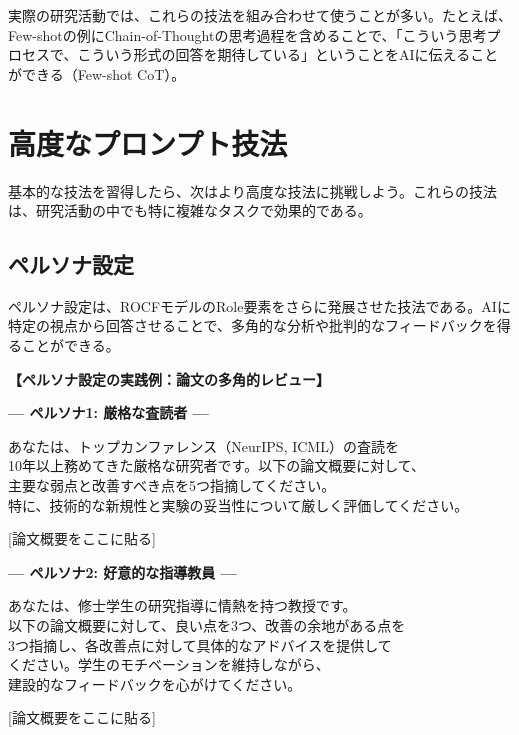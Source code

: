 実際の研究活動では、これらの技法を組み合わせて使うことが多い。たとえば、Few-shotの例にChain-of-Thoughtの思考過程を含めることで、「こういう思考プロセスで、こういう形式の回答を期待している」ということをAIに伝えることができる（Few-shot CoT）。

\section{高度なプロンプト技法}
\label{sec:2.4}

基本的な技法を習得したら、次はより高度な技法に挑戦しよう。これらの技法は、研究活動の中でも特に複雑なタスクで効果的である。

\subsection{ペルソナ設定}

ペルソナ設定は、ROCFモデルのRole要素をさらに発展させた技法である。AIに特定の視点から回答させることで、多角的な分析や批判的なフィードバックを得ることができる。

\begin{promptbox}
\textbf{【ペルソナ設定の実践例：論文の多角的レビュー】}

\textbf{--- ペルソナ1: 厳格な査読者 ---}

あなたは、トップカンファレンス（NeurIPS, ICML）の査読を\\
10年以上務めてきた厳格な研究者です。以下の論文概要に対して、\\
主要な弱点と改善すべき点を5つ指摘してください。\\
特に、技術的な新規性と実験の妥当性について厳しく評価してください。

{[}論文概要をここに貼る]
\end{promptbox}

\begin{promptbox}
\textbf{--- ペルソナ2: 好意的な指導教員 ---}

あなたは、修士学生の研究指導に情熱を持つ教授です。\\
以下の論文概要に対して、良い点を3つ、改善の余地がある点を\\
3つ指摘し、各改善点に対して具体的なアドバイスを提供して\\
ください。学生のモチベーションを維持しながら、\\
建設的なフィードバックを心がけてください。

{[}論文概要をここに貼る]
\end{promptbox}

